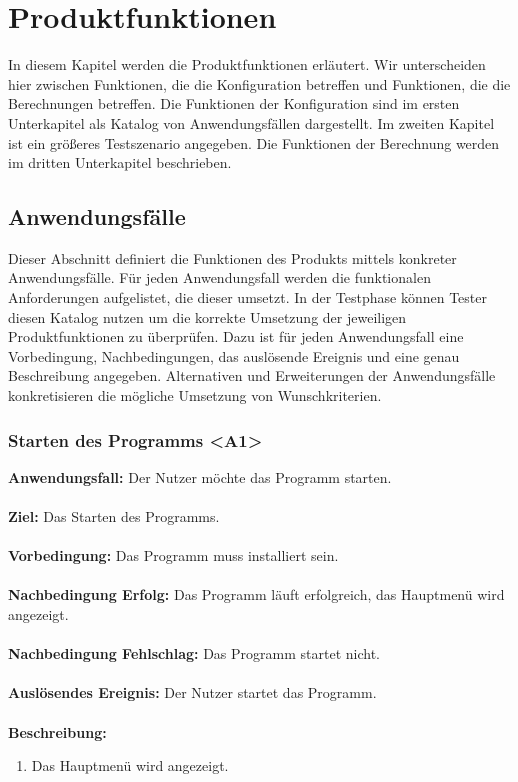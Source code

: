 \documentclass[parskip=full]{scrartcl} %
\begin{document}
\section{Produktfunktionen}
In diesem Kapitel werden die Produktfunktionen erläutert. Wir unterscheiden hier zwischen Funktionen, die die Konfiguration betreffen und Funktionen, die die Berechnungen betreffen. Die Funktionen der Konfiguration sind im ersten Unterkapitel als Katalog von Anwendungsfällen dargestellt. Im zweiten Kapitel ist ein größeres Testszenario angegeben. Die Funktionen der Berechnung werden im dritten Unterkapitel beschrieben.

\subsection{Anwendungsfälle}
Dieser Abschnitt definiert die Funktionen des Produkts mittels konkreter Anwendungsfälle. Für jeden Anwendungsfall werden die funktionalen Anforderungen aufgelistet, die dieser umsetzt. In der Testphase können Tester diesen Katalog nutzen um die korrekte Umsetzung der jeweiligen Produktfunktionen zu überprüfen. Dazu ist für jeden Anwendungsfall eine Vorbedingung, Nachbedingungen, das auslösende Ereignis und eine genau Beschreibung angegeben. Alternativen und Erweiterungen der Anwendungsfälle konkretisieren die mögliche Umsetzung von Wunschkriterien.
\newpage


\subsubsection*{Starten des Programms <A1>}
\textbf{Anwendungsfall:}  Der Nutzer möchte das Programm starten.\\\\
\textbf{Ziel:} Das Starten des Programms. \\\\
\textbf{Vorbedingung:} Das Programm muss installiert sein.  \\\\
\textbf{Nachbedingung Erfolg:} Das Programm läuft erfolgreich, das Hauptmenü wird angezeigt.\\\\
\textbf{Nachbedingung Fehlschlag:} Das Programm startet nicht. \\\\
\textbf{Auslösendes Ereignis:} Der Nutzer startet das Programm. \\\\
\textbf{Beschreibung:}
\begin{enumerate}
    \item Das Hauptmenü wird angezeigt.
\end{enumerate}
\newpage
\end{document}
